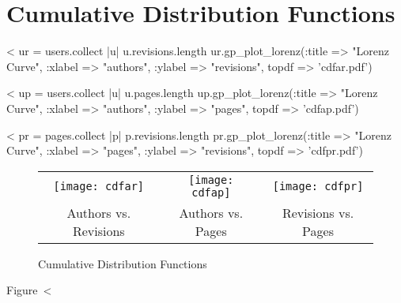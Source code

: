 \documentclass{scrartcl}
\begin{document}




\section{Cumulative Distribution Functions} %
\label{sec:cumulative_distribution_functions}

<%
ur = users.collect { |u| u.revisions.length }
ur.gp_plot_lorenz(:title => "Lorenz Curve", :xlabel => "authors", :ylabel => "revisions", topdf => 'cdfar.pdf')

<%
up = users.collect { |u| u.pages.length }
up.gp_plot_lorenz(:title => "Lorenz Curve", :xlabel => "authors", :ylabel => "pages", topdf => 'cdfap.pdf')

<%
pr = pages.collect { |p| p.revisions.length }
pr.gp_plot_lorenz(:title => "Lorenz Curve", :xlabel => "pages", :ylabel => "revisions", topdf => 'cdfpr.pdf')

\begin{figure}[htbp]
  \centering
  \begin{tabular}{@{}ccc@{}}
    \texttt{[image: cdfar]} &
    \texttt{[image: cdfap]} &
    \texttt{[image: cdfpr]}\\
    Authors vs. Revisions &
    Authors vs. Pages &
    Revisions vs. Pages
  \end{tabular}
  \caption{Cumulative Distribution Functions}
  \label{fig:cumulative_distribution_functions}
\end{figure}

Figure~<%
\end{document}
